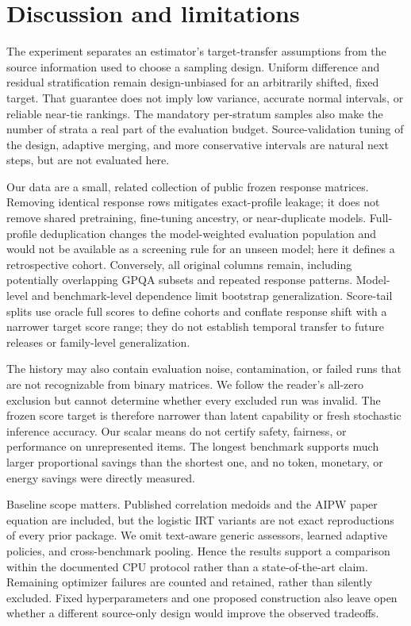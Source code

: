 \documentclass{article}
\begin{document}
\section{Discussion and limitations}
\label{sec:limitations}
The experiment separates an estimator's target-transfer assumptions from the source information used to choose a sampling design. Uniform difference and residual stratification remain design-unbiased for an arbitrarily shifted, fixed target. That guarantee does not imply low variance, accurate normal intervals, or reliable near-tie rankings. The mandatory per-stratum samples also make the number of strata a real part of the evaluation budget. Source-validation tuning of the design, adaptive merging, and more conservative intervals are natural next steps, but are not evaluated here.

Our data are a small, related collection of public frozen response matrices. Removing identical response rows mitigates exact-profile leakage; it does not remove shared pretraining, fine-tuning ancestry, or near-duplicate models. Full-profile deduplication changes the model-weighted evaluation population and would not be available as a screening rule for an unseen model; here it defines a retrospective cohort. Conversely, all original columns remain, including potentially overlapping GPQA subsets and repeated response patterns. Model-level and benchmark-level dependence limit bootstrap generalization. Score-tail splits use oracle full scores to define cohorts and conflate response shift with a narrower target score range; they do not establish temporal transfer to future releases or family-level generalization.

The history may also contain evaluation noise, contamination, or failed runs that are not recognizable from binary matrices. We follow the reader's all-zero exclusion but cannot determine whether every excluded run was invalid. The frozen score target is therefore narrower than latent capability or fresh stochastic inference accuracy. Our scalar means do not certify safety, fairness, or performance on unrepresented items. The longest benchmark supports much larger proportional savings than the shortest one, and no token, monetary, or energy savings were directly measured.

Baseline scope matters. Published correlation medoids and the AIPW paper equation are included, but the logistic IRT variants are not exact reproductions of every prior package. We omit text-aware generic assessors, learned adaptive policies, and cross-benchmark pooling. Hence the results support a comparison within the documented CPU protocol rather than a state-of-the-art claim. Remaining optimizer failures are counted and retained, rather than silently excluded. Fixed hyperparameters and one proposed construction also leave open whether a different source-only design would improve the observed tradeoffs.
\end{document}
